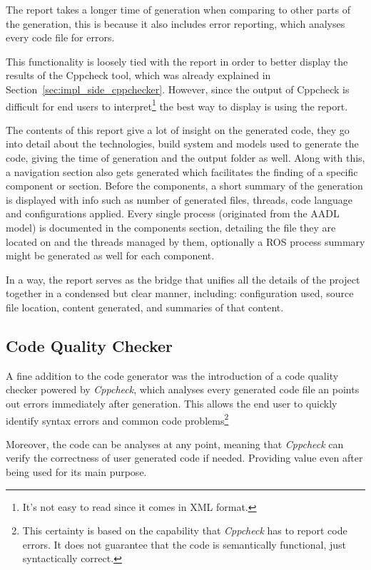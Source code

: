 The report takes a longer time of generation when comparing to other parts of the generation, this is because it also includes error reporting, which analyses every code file for errors.

This functionality is loosely tied with the report in order to better display the results of the Cppcheck tool, which was already explained in Section~\ref{sec:impl_side_cppchecker}. However, since the output of Cppcheck is difficult for end users to interpret\footnote{It's not easy to read since it comes in XML format.} the best way to display is using the report.

The contents of this report give a lot of insight on the generated code, they go into detail about the technologies, build system and models used to generate the code, giving the time of generation and the output folder as well. Along with this, a navigation section also gets generated which facilitates the finding of a specific component or section. Before the components, a short summary of the generation is displayed with info such as number of generated files, threads, code language and configurations applied. Every single process (originated from the \gls{AADL} model) is documented in the components section, detailing the file they are located on and the threads managed by them, optionally a \gls{ROS} process summary might be generated as well for each component. 

In a way, the report serves as the bridge that unifies all the details of the project together in a condensed but clear manner, including: configuration used, source file location, content generated, and summaries of that content.

\subsection{Code Quality Checker}
\label{sec:impl_code_qual_checker}

A fine addition to the code generator was the introduction of a code quality checker powered by \textit{Cppcheck}, which analyses every generated code file an points out errors immediately after generation. This allows the end user to quickly identify syntax errors and common code problems\footnote{This certainty is based on the capability that \textit{Cppcheck} has to report code errors. It does not guarantee that the code is semantically functional, just syntactically correct.}

Moreover, the code can be analyses at any point, meaning that \textit{Cppcheck} can verify the correctness of user generated code if needed. Providing value even after being used for its main purpose.

